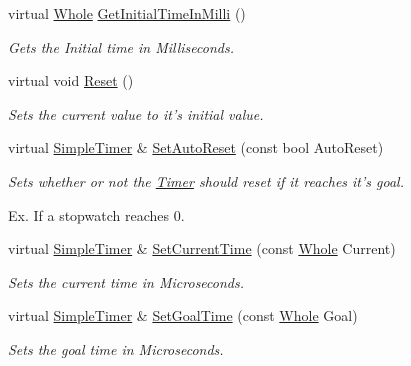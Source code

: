 \begin{DoxyCompactItemize}
virtual \hyperlink{namespaceMezzanine_adcbb6ce6d1eb4379d109e51171e2e493}{Whole} \hyperlink{classMezzanine_1_1SimpleTimer_af5a5eefa23c2dc50f14936d45c556b53}{GetInitialTimeInMilli} ()
\begin{DoxyCompactList}\small\item\em Gets the Initial time in Milliseconds. \item\end{DoxyCompactList}\item 
\hypertarget{classMezzanine_1_1SimpleTimer_a334696cd09689fb26c4e545a76220522}{
virtual void \hyperlink{classMezzanine_1_1SimpleTimer_a334696cd09689fb26c4e545a76220522}{Reset} ()}
\label{classMezzanine_1_1SimpleTimer_a334696cd09689fb26c4e545a76220522}

\begin{DoxyCompactList}\small\item\em Sets the current value to it's initial value. \item\end{DoxyCompactList}\item 
virtual \hyperlink{classMezzanine_1_1SimpleTimer}{SimpleTimer} \& \hyperlink{classMezzanine_1_1SimpleTimer_affc02e33add5e8d49116997f94c6407f}{SetAutoReset} (const bool AutoReset)
\begin{DoxyCompactList}\small\item\em Sets whether or not the \hyperlink{classMezzanine_1_1Timer}{Timer} should reset if it reaches it's goal. \par
 Ex. If a stopwatch reaches 0. \item\end{DoxyCompactList}\item 
virtual \hyperlink{classMezzanine_1_1SimpleTimer}{SimpleTimer} \& \hyperlink{classMezzanine_1_1SimpleTimer_aaa7df02f1192ec7a932cbcb7b3efdbb4}{SetCurrentTime} (const \hyperlink{namespaceMezzanine_adcbb6ce6d1eb4379d109e51171e2e493}{Whole} Current)
\begin{DoxyCompactList}\small\item\em Sets the current time in Microseconds. \item\end{DoxyCompactList}\item 
virtual \hyperlink{classMezzanine_1_1SimpleTimer}{SimpleTimer} \& \hyperlink{classMezzanine_1_1SimpleTimer_a2c34bfc917fa3ff5862dd12c2e31c1c6}{SetGoalTime} (const \hyperlink{namespaceMezzanine_adcbb6ce6d1eb4379d109e51171e2e493}{Whole} Goal)
\begin{DoxyCompactList}\small\item\em Sets the goal time in Microseconds. \item\end{DoxyCompactList}\item 

\end{DoxyCompactItemize}

